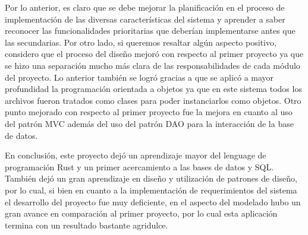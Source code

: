 \documentclass[12pt]{article}
\begin{document}
Por lo anterior, es claro que se debe mejorar la planificación en el proceso de implementación de las diversas características del sistema y aprender a saber reconocer las funcionalidades prioritarias que deberían implementarse antes que las secundarias. Por otro lado, si queremos resaltar algún aspecto positivo, considero que el proceso del diseño mejoró con respecto al primer proyecto ya que se hizo una separación mucho más clara de las responsabilidades de cada módulo del proyecto. Lo anterior también se logró gracias a que se aplicó a mayor profundidad la programación orientada a objetos ya que en este sistema todos los archivos fueron tratados como clases para poder instanciarlos como objetos. Otro punto mejorado con respecto al primer proyecto fue la mejora en cuanto al uso del patrón MVC además del uso del patrón DAO para la interacción de la base de datos.

En conclusión, este proyecto dejó un aprendizaje mayor del lenguage de programación Rust y un primer acercamiento a las bases de datos y SQL. También dejó un gran aprendizaje en diseño y utilización de patrones de diseño, por lo cual, si bien en cuanto a la implementación de requerimientos del sistema el desarrollo del proyecto fue muy deficiente, en el aspecto del modelado hubo un gran avance en comparación al primer proyecto, por lo cual esta aplicación termina con un resultado bastante agridulce.
\end{document}
